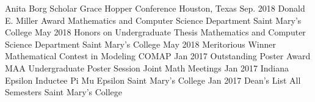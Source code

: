 \begin{cvhonors}
  \cvhonor
    {Anita Borg Scholar}
    {Grace Hopper Conference}
    {Houston, Texas}
    {Sep. 2018}
  \cvhonor
    {Donald E. Miller Award}
    {Mathematics and Computer Science Department}
    {Saint Mary's College}
    {May 2018}
  \cvhonor
    {Honors on Undergraduate Thesis}
    {Mathematics and Computer Science Department}
    {Saint Mary's College}
    {May 2018}
  \cvhonor
    {Meritorious Winner}
    {Mathematical Contest in Modeling}
    {COMAP}
    {Jan 2017}
  \cvhonor
    {Outstanding Poster Award}
    {MAA Undergraduate Poster Session}
    {Joint Math Meetings}
    {Jan 2017}
  \cvhonor
    {Indiana Epsilon Inductee}
    {Pi Mu Epsilon}
    {Saint Mary's College}
    {Jan 2017}
  \cvhonor
    {Dean's List}
    {All Semesters}
    {Saint Mary's College}
    {}
\end{cvhonors}
